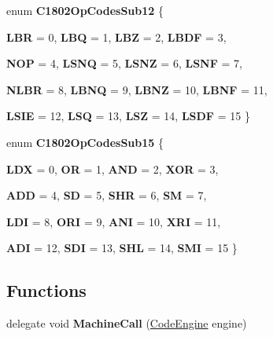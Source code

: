 \begin{DoxyCompactItemize}
enum {\bfseries C1802OpCodesSub12} \{ \par
{\bfseries LBR} =  0, 
{\bfseries LBQ} =  1, 
{\bfseries LBZ} =  2, 
{\bfseries LBDF} =  3, 
\par
{\bfseries NOP} =  4, 
{\bfseries LSNQ} =  5, 
{\bfseries LSNZ} =  6, 
{\bfseries LSNF} =  7, 
\par
{\bfseries NLBR} =  8, 
{\bfseries LBNQ} =  9, 
{\bfseries LBNZ} =  10, 
{\bfseries LBNF} =  11, 
\par
{\bfseries LSIE} =  12, 
{\bfseries LSQ} =  13, 
{\bfseries LSZ} =  14, 
{\bfseries LSDF} =  15
 \}
\item 
enum {\bfseries C1802OpCodesSub15} \{ \par
{\bfseries LDX} =  0, 
{\bfseries OR} =  1, 
{\bfseries AND} =  2, 
{\bfseries XOR} =  3, 
\par
{\bfseries ADD} =  4, 
{\bfseries SD} =  5, 
{\bfseries SHR} =  6, 
{\bfseries SM} =  7, 
\par
{\bfseries LDI} =  8, 
{\bfseries ORI} =  9, 
{\bfseries ANI} =  10, 
{\bfseries XRI} =  11, 
\par
{\bfseries ADI} =  12, 
{\bfseries SDI} =  13, 
{\bfseries SHL} =  14, 
{\bfseries SMI} =  15
 \}
\end{DoxyCompactItemize}
\subsection*{Functions}
\begin{DoxyCompactItemize}
\item 
\hypertarget{namespace_eimu_1_1_core_1_1_systems_1_1_c_d_p1802_a21304fc6fffc5c6b002c4e9c63e5e1bc}{
delegate void {\bfseries MachineCall} (\hyperlink{class_eimu_1_1_core_1_1_systems_1_1_s_chip8_1_1_code_engine}{CodeEngine} engine)}
\label{namespace_eimu_1_1_core_1_1_systems_1_1_c_d_p1802_a21304fc6fffc5c6b002c4e9c63e5e1bc}

\end{DoxyCompactItemize}
